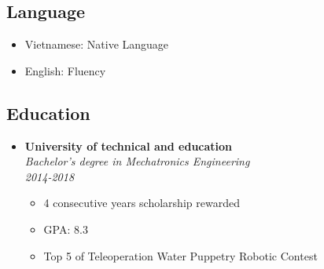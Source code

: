 \documentclass[10pt,oneside,a4paper]{article}
\begin{document}
\begin{tcolorbox}
\begin{minipage}[t]{8cm}
\begin{tcolorbox}[grow to left by=0.6cm, colback=gray!25,colframe=white]
            \section*{Language}
            \begin{itemize}
                \item {Vietnamese: Native Language}
                \item {English: Fluency}
            \end{itemize}
            \vspace*{12\baselineskip}
        \end{tcolorbox}
    \end{minipage}
    \begin{minipage}[t]{11cm}
        \vspace*{-0.5cm}
        \begin{tcolorbox}[grow to right by=0.75cm,colback=white,colframe=white]
            \section*{Education}
            \begin{itemize}
                \item 
                {
                    \textbf{University of technical and education} \\
                    \emph{Bachelor’s degree in Mechatronics Engineering} \\
                    \emph{2014-2018}
                    \begin{itemize}[label=$\circ$]
                        \item {4 consecutive years scholarship rewarded}
                        \item {GPA: 8.3}
                        \item {Top 5 of Teleoperation Water Puppetry Robotic Contest}
                    \end{itemize}
                }
            \end{itemize}


\end{tcolorbox}
\end{minipage}
\end{tcolorbox}
\end{document}
